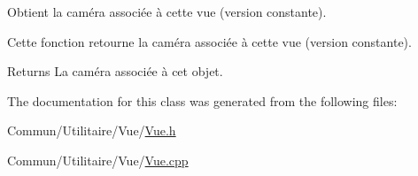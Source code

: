 Obtient la caméra associée à cette vue (version constante). 

Cette fonction retourne la caméra associée à cette vue (version constante).

\begin{DoxyReturn}{Returns}
La caméra associée à cet objet. 
\end{DoxyReturn}


The documentation for this class was generated from the following files\+:\begin{DoxyCompactItemize}
\item 
Commun/\+Utilitaire/\+Vue/\hyperlink{_vue_8h}{Vue.\+h}\item 
Commun/\+Utilitaire/\+Vue/\hyperlink{_vue_8cpp}{Vue.\+cpp}\end{DoxyCompactItemize}
